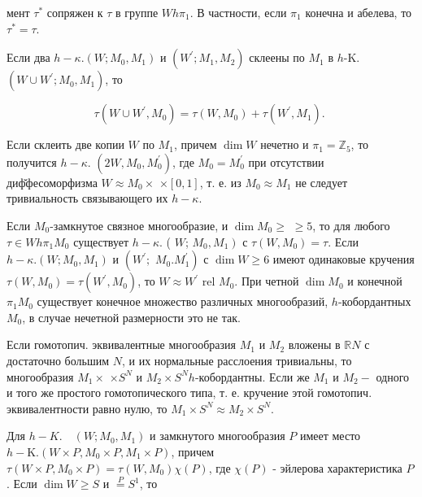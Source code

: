\documentclass[10pt]{article}
\begin{document}
мент $\tau^{*}$ сопряжен к $\tau$ в группе $W h \pi_{1}$. В частности, если $\pi_{1}$ конечна и абелева, то $\tau^{*}=\tau$.



Если два $h-\kappa .\left(W ; M_{0}, M_{1}\right)$ и $\left(W^{\prime} ; M_{1}, M_{2}\right)$ склеены по $M_{1}$ в $h$-K. $\left(W \cup W^{\prime} ; M_{0}, M_{1}\right)$, то



\[

\tau\left(W \cup W^{\prime}, M_{0}\right)=\tau\left(W, M_{0}\right)+\tau\left(W^{\prime}, M_{1}\right) \text {. }

\]



Если склеить две копии $W$ по $M_{1}$, причем $\operatorname{dim} W$ нечетно и $\pi_{1}=\mathbb{Z}_{5}$, то получится $h-\kappa$. $\left(2 W, M_{0}, M_{0}^{\prime}\right)$, где $M_{0}=M_{0}^{\prime}$ при отсутствии диф̆фесоморфизма $W \approx M_{0} \times$ $\times[0,1]$, т. е. из $M_{0} \approx M_{1}$ не следует тривиальность связывающего их $h-\kappa$.



Если $M_{0}$-замкнутое связное многообразие, и $\operatorname{dim} M_{0} \geqslant$ $\geqslant 5$, то для любого $\tau \in W h \pi_{1} M_{0}$ существует $h-\kappa$. ( $W$; $\left.M_{0}, M_{1}\right)$ с $\tau\left(W, M_{0}\right)=\tau$. Если $h-\kappa .\left(W ; M_{0}, M_{1}\right)$ и $\left(W^{\prime} ;\right.$ $\left.M_{0} . M_{1}^{\prime}\right)$ с $\operatorname{dim} W \geqslant 6$ имеют одинаковые кручения $\tau\left(W, M_{0}\right)=\tau\left(W^{\prime}, M_{0}\right)$, то $W \approx W^{\prime}$ rel $M_{0}$. При четной $\operatorname{dim} M_{0}$ и конечной $\pi_{1} M_{0}$ существует конечное множество различных многообразий, $h$-кобордантных $M_{0}$, в случае нечетной размерности это не так.



Если гомотопич. эквивалентные многообразия $M_{1}$ и $M_{2}$ вложены в $\mathbb{R} N$ с достаточно большим $N$, и их нормальные расслоения тривиальны, то многообразия $M_{1} \times$ $\times S^{N}$ и $M_{2} \times S^{N} h$-кобордантны. Если же $M_{1}$ и $M_{2}-$ одного и того же простого гомотопического типа, т. е. кручение этой гомотопич. эквивалентности равно нулю, то $M_{1} \times S^{N} \approx M_{2} \times S^{N}$.



Для $h-K . \quad\left(W ; M_{0}, M_{1}\right)$ и замкнутого многообразия $P$ имеет место $h-\mathrm{K} .\left(W \times P, M_{0} \times P, M_{1} \times P\right)$, причем $\tau\left(W \times P, M_{0} \times P\right)=\tau\left(W, M_{0}\right) \chi(P)$, где $\chi(P)$ - эйлерова характеристика $P$. Если $\operatorname{dim} W \geqslant S$ и $\stackrel{P}{=} S^{1}$, то
\end{document}
